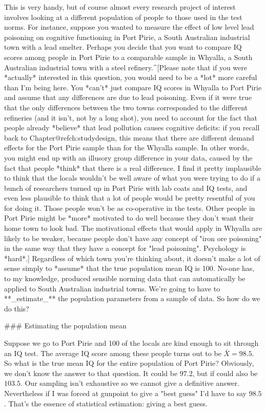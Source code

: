 This is very handy, but of course almost every research project of interest involves looking at a different population of people to those used in the test norms. For instance, suppose you wanted to measure the effect of low level lead poisoning on cognitive functioning in Port Pirie, a South Australian industrial town with a lead smelter. Perhaps you decide that you want to compare IQ scores among people in Port Pirie to a comparable sample in Whyalla, a South Australian industrial town with a steel refinery.^[Please note that if you were *actually* interested in this question, you would need to be a *lot* more careful than I'm being here. You *can't* just compare IQ scores in Whyalla to Port Pirie and assume that any differences are due to lead poisoning. Even if it were true that the only differences between the two towns corresponded to the different refineries (and it isn't, not by a long shot), you need to account for the fact that people already *believe* that lead pollution causes cognitive deficits: if you recall back to Chapter@refch:studydesign, this means that there are different demand effects for the Port Pirie sample than for the Whyalla sample. In other words, you might end up with an illusory group difference in your data, caused by the fact that people *think* that there is a real difference. I find it pretty implausible to think that the locals wouldn't be well aware of what you were trying to do if a bunch of researchers turned up in Port Pirie with lab coats and IQ tests, and even less plausible to think that a lot of people would be pretty resentful of you for doing it. Those people won't be as co-operative in the tests. Other people in Port Pirie might be *more* motivated to do well because they don't want their home town to look bad. The motivational effects that would apply in Whyalla are likely to be weaker, because people don't have any concept of "iron ore poisoning" in the same way that they have a concept for "lead poisoning". Psychology is *hard*.] Regardless of which town you're thinking about, it doesn't make a lot of sense simply to *assume* that the true population mean IQ is 100. No-one has, to my knowledge, produced sensible norming data that can automatically be applied to South Australian industrial towns. We're going to have to **_estimate_** the population parameters from a sample of data. So how do we do this?

### Estimating the population mean

Suppose we go to Port Pirie and 100 of the locals are kind enough to sit through an IQ test. The average IQ score among these people turns out to be $\bar{X}=98.5$. So what is the true mean IQ for the entire population of Port Pirie? Obviously, we don't know the answer to that question. It could be $97.2$, but if could also be $103.5$. Our sampling isn't exhaustive so we cannot give a definitive answer. Nevertheless if I was forced at gunpoint to give a "best guess" I'd have to say $98.5$. That's the essence of statistical estimation: giving a best guess. 

